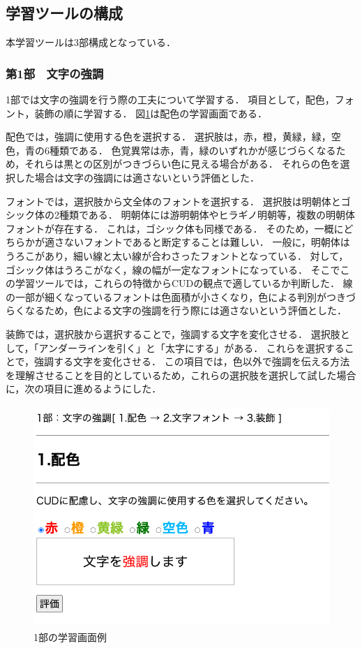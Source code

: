 \clearpage

\subsection{学習ツールの構成}
本学習ツールは3部構成となっている．

\subsubsection{第1部　文字の強調}
1部では文字の強調を行う際の工夫について学習する．
項目として，配色，フォント，装飾の順に学習する．
図\ref{fig:gamen_1bu}は配色の学習画面である．

配色では，強調に使用する色を選択する．
選択肢は，赤，橙，黄緑，緑，空色，青の6種類である．
色覚異常は赤，青，緑のいずれかが感じづらくなるため，それらは黒との区別がつきづらい色に見える場合がある．
それらの色を選択した場合は文字の強調には適さないという評価とした．

フォントでは，選択肢から文全体のフォントを選択する．
選択肢は明朝体とゴシック体の2種類である．
明朝体には游明朝体やヒラギノ明朝等，複数の明朝体フォントが存在する．
これは，ゴシック体も同様である．
そのため，一概にどちらかが適さないフォントであると断定することは難しい．
一般に，明朝体はうろこがあり，細い線と太い線が合わさったフォントとなっている．
対して，ゴシック体はうろこがなく，線の幅が一定なフォントになっている．
そこでこの学習ツールでは，これらの特徴からCUDの観点で適しているか判断した．
線の一部が細くなっているフォントは色面積が小さくなり，色による判別がつきづらくなるため，色による文字の強調を行う際には適さないという評価とした．

装飾では，選択肢から選択することで，強調する文字を変化させる．
選択肢として，「アンダーラインを引く」と「太字にする」がある．
これらを選択することで，強調する文字を変化させる．
この項目では，色以外で強調を伝える方法を理解させることを目的としているため，これらの選択肢を選択して試した場合に，次の項目に進めるようにした．

\begin{figure}[h]
\begin{center}
 \includegraphics[clip,width=122mm,height=84mm]{images/gamen_1bu.png}
\end{center}
 \caption{1部の学習画面例}
 \label{fig:gamen_1bu}
\end{figure}

